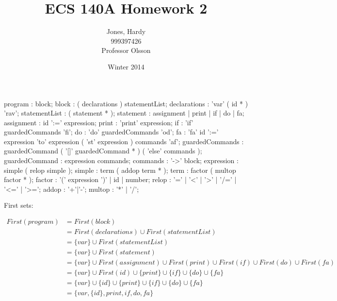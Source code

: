 \documentclass[12pt,letterpaper]{article}
\title{ECS 140A Homework 2\vspace{-2ex}}
\author{Jones, Hardy\\
        999397426\\
        Professor Olsson\vspace{-2ex}}
\date{Winter 2014}
\begin{document}
  \maketitle

  \begin{rail}
    program : block;
    block : ( declarations ) statementList;
    declarations : 'var' ( id * ) 'rav';
    statementList : ( statement * );
    statement : assignment | print | if | do | fa;
    assignment : id ':=' expression;
    print : 'print' expression;
    if : 'if' guardedCommands 'fi';
    do : 'do' guardedCommands 'od';
    fa : 'fa' id ':=' expression 'to' expression ( 'st' expression ) commands 'af';
    guardedCommands : guardedCommand ( '[]' guardedCommand * ) ( 'else' commands );
    guardedCommand : expression commands;
    commands : '->' block;
    expression : simple ( relop simple );
    simple : term ( addop term * );
    term : factor ( multop factor * );
    factor : '(' expression ')' | id | number;
    relop : '=' | '<' | '>' | '/=' | '<=' | '>=';
    addop : '+'|'-';
    multop : '*' | '/';
  \end{rail}


  First sets:

  \begin{align*}
    First(program) &= First(block) \\
    &= First(declarations) \cup First(statementList) \\
    &= \{ var \} \cup First(statementList) \\
    &= \{ var \} \cup First(statement) \\
    &= \{ var \} \cup First(assignment) \cup First(print) \cup First(if) \cup First(do) \cup First(fa)\\
    &= \{ var \} \cup First(id) \cup \{ print \} \cup \{ if \} \cup \{ do \} \cup \{ fa \}\\
    &= \{ var \} \cup \{ id \} \cup \{ print \} \cup \{ if \} \cup \{ do \} \cup \{ fa \}\\
    &= \{ var, \{ id \}, print, if, do, fa \}\\
  \end{align*}
\end{document}
